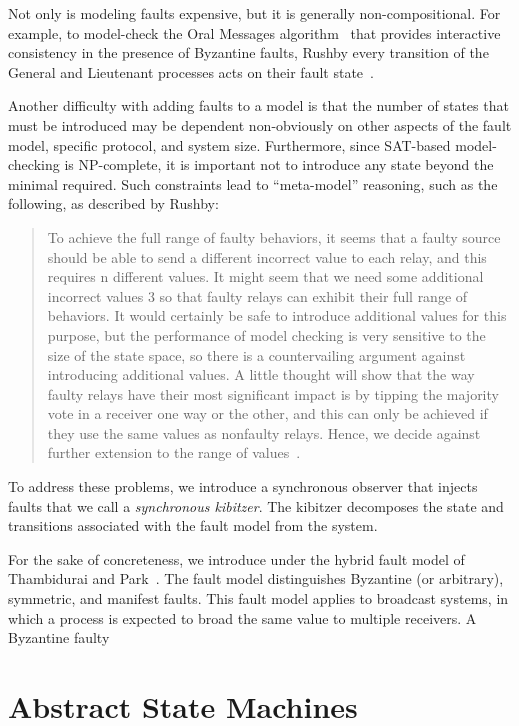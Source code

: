 \documentclass{IEEEtran/IEEEtran}
\begin{document}
Not only is modeling faults expensive, but it is generally non-compositional. For example, to model-check the Oral Messages algorithm~\cite{} that provides interactive consistency in the presence of Byzantine faults, Rushby every transition of the General and Lieutenant processes acts on their fault state~\cite{}.

Another difficulty with adding faults to a model is that the number of states that must be introduced may be dependent non-obviously on other aspects of the fault model, specific protocol, and system size. Furthermore, since SAT-based model-checking is NP-complete, it is important not to introduce any state beyond the minimal required. Such constraints lead to ``meta-model'' reasoning, such as the following, as described by Rushby:

\begin{quote}
To achieve the full range of faulty behaviors, it seems that a faulty source should be able to send a different incorrect value to each relay, and this requires n different values. It might seem that we need some additional incorrect values 3 so that faulty relays can exhibit their full range of behaviors. It would certainly be safe to introduce additional values for this purpose, but the performance of model checking is very sensitive to the size of the state space, so there is a countervailing argument against introducing additional values. A little thought will show that the way faulty relays have their most significant impact is by tipping the majority vote in a receiver one way or the other, and this can only be achieved if they use the same values as nonfaulty relays. Hence, we decide against further extension to the range of values~\cite{}.
\end{quote}

To address these problems, we introduce a synchronous observer that injects faults that we call a \emph{synchronous kibitzer}. The kibitzer decomposes the state and transitions associated with the fault model from the system.

For the sake of concreteness, we introduce
 under the hybrid fault model of Thambidurai and Park~\cite{}. The fault model distinguishes Byzantine (or arbitrary), symmetric, and manifest faults. This fault model applies to broadcast systems, in which a process is expected to broad the same value to multiple receivers. A Byzantine faulty

\section{Abstract State Machines}\label{sec:abstract}
\end{document}
